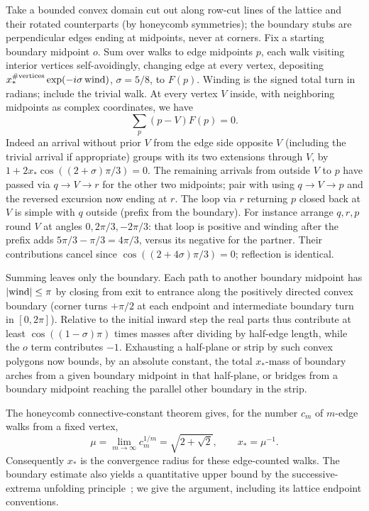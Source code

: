 Take a bounded convex domain cut out along row-cut lines of the lattice and their rotated counterparts (by honeycomb symmetries); the boundary stubs are perpendicular edges ending at midpoints, never at corners. Fix a starting boundary midpoint \(o\). Sum over walks to edge midpoints \(p\), each walk visiting interior vertices self-avoidingly, changing edge at every vertex, depositing
\(x_*^{\#\mathrm{vertices}}\exp(-i\sigma\,{\rm wind})\), \(\sigma=5/8\), to \(F(p)\). Winding is the signed total turn in radians; include the trivial walk. At every vertex \(V\) inside, with neighboring midpoints as complex coordinates, we have
\[
 \sum_p(p-V)F(p)=0.
\]
Indeed an arrival without prior \(V\) from the edge side opposite \(V\) (including the trivial arrival if appropriate) groups with its two extensions through \(V\), by \(1+2x_*\cos((2+\sigma)\pi/3)=0\). The remaining arrivals from outside \(V\) to \(p\) have passed via \(q\to V\to r\) for the other two midpoints; pair with using \(q\to V\to p\) and the reversed excursion now ending at \(r\). The loop via \(r\) returning \(p\) closed back at \(V\) is simple with \(q\) outside (prefix from the boundary). For instance arrange \(q,r,p\) round \(V\) at angles \(0,2\pi/3,-2\pi/3\): that loop is positive and winding after the prefix adds \(5\pi/3-\pi/3=4\pi/3\), versus its negative for the partner. Their contributions cancel since \(\cos((2+4\sigma)\pi/3)=0\); reflection is identical.

Summing leaves only the boundary. Each path to another boundary midpoint has \(|{\rm wind}|\le\pi\) by closing from exit to entrance along the positively directed convex boundary (corner turns \(+\pi/2\) at each endpoint and intermediate boundary turn in \([0,2\pi]\)). Relative to the initial inward step the real parts thus contribute at least \(\cos((1-\sigma)\pi)\) times masses after dividing by half-edge length, while the \(o\) term contributes \(-1\). Exhausting a half-plane or strip by such convex polygons now bounds, by an absolute constant, the total \(x_*\)-mass of boundary arches from a given boundary midpoint in that half-plane, or bridges from a boundary midpoint reaching the parallel other boundary in the strip.


The honeycomb connective-constant theorem
\cite[Theorem~1]{DuminilCopinSmirnov2012} gives, for the number $c_m$ of
$m$-edge walks from a fixed vertex,
\[
 \mu=\lim_{m\to\infty}c_m^{1/m}=\sqrt{2+\sqrt2},\qquad x_*=\mu^{-1}.
\]
Consequently $x_*$ is the convergence radius for these edge-counted walks.
The boundary estimate also yields a quantitative upper bound by the
successive-extrema unfolding principle~\cite{HammersleyWelsh1962}; we give
the argument, including its lattice endpoint conventions.

